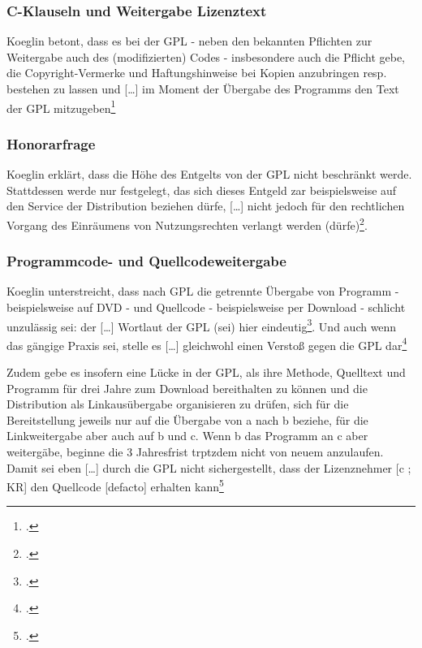 \documentclass[DIV=calc,BCOR=5mm,11pt,headings=small,oneside,abstract=true, toc=bib]{scrartcl}
\begin{document}
\subsubsection{C-Klauseln und Weitergabe Lizenztext}
Koeglin betont, dass es bei der GPL - neben den bekannten Pflichten zur
Weitergabe auch des (modifizierten) Codes - insbesondere auch die Pflicht gebe,
die Copyright-Vermerke und Haftungshinweise bei Kopien anzubringen resp.
bestehen zu lassen und \glqq{}[\ldots] im Moment der Übergabe des Programms
den Text der GPL mitzugeben\grqq{}\footcite[vgl.][192]{Koglin2007a}

\subsubsection{Honorarfrage}

Koeglin erklärt, dass die Höhe des Entgelts von der GPL nicht beschränkt werde.
Stattdessen werde nur festgelegt, das sich dieses Entgeld zar beispielsweise auf
den Service der Distribution beziehen dürfe, \glqq{}[\ldots] nicht jedoch
für den rechtlichen Vorgang des Einräumens von Nutzungsrechten verlangt
werden (dürfe)\grqq{}\footcite[vgl.][198]{Koglin2007a}.

\subsubsection{Programmcode- und Quellcodeweitergabe}

Koeglin unterstreicht, dass nach GPL die getrennte Übergabe von Programm -
beispielsweise auf DVD - und Quellcode - beispielsweise per Download - schlicht
unzulässig sei: der \glqq{}[\ldots] Wortlaut der GPL (sei) hier
eindeutig\grqq{}\footcite[vgl.][203]{Koglin2007a}. Und auch wenn das gängige
Praxis sei, stelle es \glqq{}[\ldots] gleichwohl einen Verstoß gegen die GPL
dar\grqq{}\footcite[vgl.][204]{Koglin2007a}

Zudem gebe es insofern eine Lücke in der GPL, als ihre Methode, Quelltext und
Programm für drei Jahre zum Download bereithalten zu können und die
Distribution als Linkausübergabe organisieren zu drüfen, sich für die
Bereitstellung jeweils nur auf die Übergabe von a nach b beziehe, für die
Linkweitergabe aber auch auf b und c. Wenn b das Programm an c aber weitergäbe,
beginne die 3 Jahresfrist trptzdem nicht von neuem anzulaufen. Damit sei eben
\glqq{}[\ldots] durch die GPL nicht sichergestellt, dass der Lizenznehmer
[c ; KR] den Quellcode [defacto] erhalten
kann\grqq{}\footcite[vgl.][205]{Koglin2007a}
\end{document}
